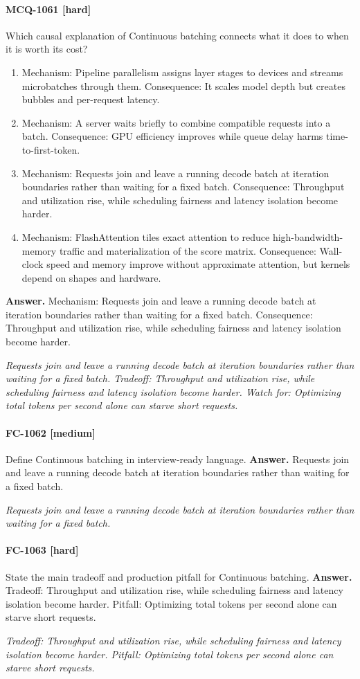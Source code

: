 \paragraph{MCQ-1061 [hard]} Which causal explanation of Continuous batching connects what it does to when it is worth its cost?
\begin{enumerate}[label=\Alph*.]
\item Mechanism: Pipeline parallelism assigns layer stages to devices and streams microbatches through them. Consequence: It scales model depth but creates bubbles and per-request latency.
\item Mechanism: A server waits briefly to combine compatible requests into a batch. Consequence: GPU efficiency improves while queue delay harms time-to-first-token.
\item Mechanism: Requests join and leave a running decode batch at iteration boundaries rather than waiting for a fixed batch. Consequence: Throughput and utilization rise, while scheduling fairness and latency isolation become harder.
\item Mechanism: FlashAttention tiles exact attention to reduce high-bandwidth-memory traffic and materialization of the score matrix. Consequence: Wall-clock speed and memory improve without approximate attention, but kernels depend on shapes and hardware.
\end{enumerate}
\noindent\textbf{Answer.} Mechanism: Requests join and leave a running decode batch at iteration boundaries rather than waiting for a fixed batch. Consequence: Throughput and utilization rise, while scheduling fairness and latency isolation become harder.
\par\textit{Requests join and leave a running decode batch at iteration boundaries rather than waiting for a fixed batch. Tradeoff: Throughput and utilization rise, while scheduling fairness and latency isolation become harder. Watch for: Optimizing total tokens per second alone can starve short requests.}
\paragraph{FC-1062 [medium]} Define Continuous batching in interview-ready language.
\noindent\textbf{Answer.} Requests join and leave a running decode batch at iteration boundaries rather than waiting for a fixed batch.
\par\textit{Requests join and leave a running decode batch at iteration boundaries rather than waiting for a fixed batch.}
\paragraph{FC-1063 [hard]} State the main tradeoff and production pitfall for Continuous batching.
\noindent\textbf{Answer.} Tradeoff: Throughput and utilization rise, while scheduling fairness and latency isolation become harder. Pitfall: Optimizing total tokens per second alone can starve short requests.
\par\textit{Tradeoff: Throughput and utilization rise, while scheduling fairness and latency isolation become harder. Pitfall: Optimizing total tokens per second alone can starve short requests.}
